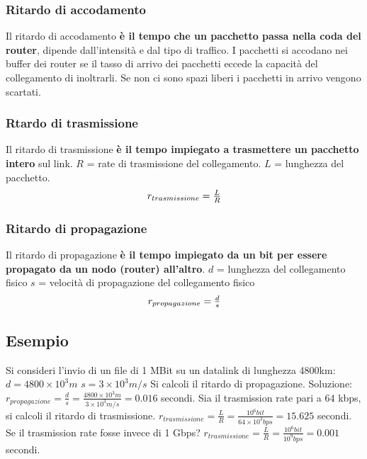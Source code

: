 \documentclass[11pt,a4paper]{article}
\theoremstyle{definition}
\begin{document}
\subsubsection{Ritardo di accodamento}
Il ritardo di accodamento \textbf{è il tempo che un pacchetto passa nella coda del router}, dipende dall'intensità e dal tipo di traffico. I pacchetti si accodano nei buffer dei router se il tasso di arrivo dei pacchetti eccede la capacità del collegamento di inoltrarli. Se non ci sono spazi liberi i pacchetti in arrivo vengono scartati.

\subsubsection{Rtardo di trasmissione}
Il ritardo di trasmissione \textbf{è il tempo impiegato a trasmettere un pacchetto intero} sul link.\newline
$R$ = rate di trasmissione del collegamento.\newline
$L$ = lunghezza del pacchetto.\newline
\[\centerline{$r_{trasmissione} = \frac{L}{R}$}\]
\subsubsection{Ritardo di propagazione}
Il ritardo di propagazione \textbf{è il tempo impiegato da un bit per essere propagato da un nodo (router) all'altro}.\newline
$d$ = lunghezza del collegamento fisico\newline
$s$ = velocità di propagazione del collegamento fisico \newline
\[\centerline{$r_{propagazione} = \frac{d}{s}$}\]

\subsection{Esempio}
Si consideri l'invio di un file di 1 MBit su un datalink di lunghezza 4800km:\newline
$d = 4800\times10^3 m$ \newline
$s = 3\times10^3 m/s$ \newline
Si calcoli il ritardo di propagazione. \newline
Soluzione:\newline\newline
$r_{propagazione} = \frac{d}{s} = \frac{4800\times10^3 m }{3\times10^3 m/s}  = 0.016$ secondi.\newline\newline
Sia il trasmission rate pari a 64 kbps, si calcoli il ritardo di trasmissione. \newline\newline
$r_{trasmissione} = \frac{L}{R} = \frac{10^6 bit}{64\times10^3 bps}= 15.625$ secondi.\newline\newline
Se il trasmission rate fosse invece di 1 Gbps? \newline\newline
$r_{trasmissione} = \frac{L}{R} = \frac{10^6 bit}{10^9 bps} = 0.001$ secondi.
\end{document}
